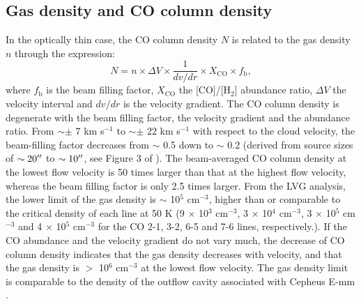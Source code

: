 \subsection{Gas density and CO column density}\label{section:density}
In the optically thin case, the CO column density $N$ is related to the gas density $n$ through the expression: 
\begin{equation}
N = n \times \Delta V \times \frac{1}{dv/dr} \times X_{\mathrm{CO}} \times f_{\mathrm{b}}, 
\end{equation}
where $f_{\mathrm{b}}$ is the beam filling factor, $X_{\mathrm{CO}}$ the [CO]/[H$_2$] abundance ratio, $\Delta V$ the velocity interval and $dv/dr$ is the velocity gradient. The CO column density is degenerate with the beam filling factor, the velocity gradient and the abundance ratio. From $\sim \pm$ 7 km s$^{-1}$ to $\sim \pm$ 22 km s$^{-1}$ with respect to the cloud velocity, the beam-filling factor decreases from $\sim$ 0.5 down to $\sim$ 0.2 (derived from source sizes of $\sim 20\mbox{$^{\prime\prime}$}$ to $\sim 10\mbox{$^{\prime\prime}$}$, see Figure 3 of \citet{2009ApJ...696...66Q}). The beam-averaged CO column density at the lowest flow velocity is 50 times larger than that at the highest flow velocity, whereas the beam filling factor is only 2.5 times larger. From the LVG analysis, the lower limit of the gas density is $\sim$ 10$^5$ cm$^{-3}$, higher than or comparable to the critical density of each line at 50 K (9 $\times$ 10$^3$ cm$^{-3}$, 3 $\times$ 10$^4$ cm$^{-3}$, 3 $\times$ 10$^5$ cm$^{-3}$ and 4 $\times$ 10$^5$ cm$^{-3}$ for the CO 2-1, 3-2, 6-5 and 7-6 lines, respectively.). If the CO abundance and the velocity gradient do not vary much, the decrease of CO column density indicates that the gas density decreases with velocity, and that the gas density is $>$ 10$^6$ cm$^{-3}$ at the lowest flow velocity. The gas density limit is comparable to the density of the outflow cavity associated with Cepheus E-mm \citep[(1-8) $\times$ 10$^5$ cm$^{-3}$:][]{2015A&A...581A...4L}.

